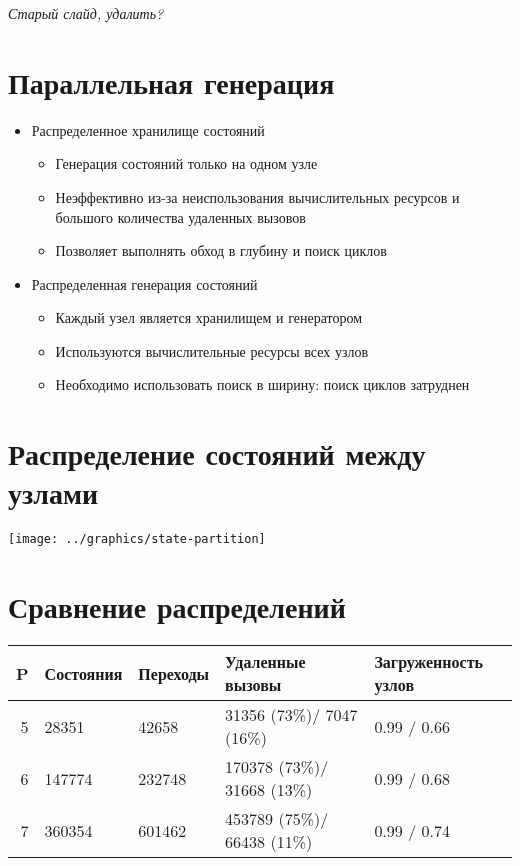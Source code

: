\documentclass[12pt]{article}
\begin{document}
\textit{Старый слайд, удалить?}

\section{Параллельная генерация}
\label{sec:par-gen}

\begin{itemize}
\item Распределенное хранилище состояний
  \begin{itemize}
  \item Генерация состояний только на одном узле
  \item Неэффективно из-за неиспользования вычислительных ресурсов и большого количества
    удаленных вызовов
  \item Позволяет выполнять обход в глубину и поиск циклов
  \end{itemize}

\item Распределенная генерация состояний
  \begin{itemize}
  \item Каждый узел является хранилищем и генератором
  \item Используются вычислительные ресурсы всех узлов
  \item Необходимо использовать поиск в ширину: поиск циклов затруднен
  \end{itemize}

\end{itemize}

\section{Распределение состояний между узлами}
\label{sec:state-partitioning}

\begin{center}
  \texttt{[image: ../graphics/state-partition]}
\end{center}

\section{Сравнение распределений}
\label{sec:partition-compare}

\begin{tabular}[ht]{|r|l|l|p{}|p{}|}
  \hline 
  P & Состояния & Переходы & Удаленные вызовы & Загруженность узлов    \\ \hline
  5 & 28351     & 42658    & 31356  (73\%)/ 7047  (16\%) & 0.99 / 0.66 \\ \hline
  6 & 147774    & 232748   & 170378 (73\%)/ 31668 (13\%) & 0.99 / 0.68 \\ \hline
  7 & 360354    & 601462   & 453789 (75\%)/ 66438 (11\%) & 0.99 / 0.74 \\ \hline
\end{tabular}
\end{document}
